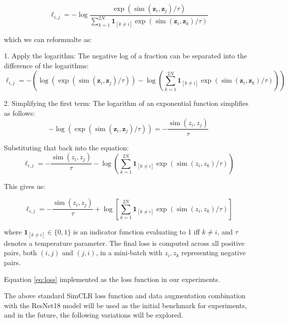 \begin{equation}
\ell_{i, j} = -\log \frac{\exp \left(\operatorname{sim}\left(\boldsymbol{z}_i, \boldsymbol{z}_j\right) / \tau\right)}{\sum_{k=1}^{2 N} \mathbf{1}_{[k \neq i]} \exp \left(\operatorname{sim}\left(\boldsymbol{z}_i, \boldsymbol{z}_k\right) / \tau\right)}
\label{eq:original}
\end{equation}
  
which we can reformualte as:

1. Apply the logarithm: The negative log of a fraction can be separated into the difference of the logarithms:
\[
\ell_{i, j} = -\left( \log \left(\exp \left(\operatorname{sim}\left(\boldsymbol{z}_i, \boldsymbol{z}_j\right) / \tau\right)\right) - \log\left( \sum_{k=1}^{2 N} \mathbf{1}_{[k \neq i]} \exp \left(\operatorname{sim}\left(\boldsymbol{z}_i, \boldsymbol{z}_k\right) / \tau\right) \right) \right)
\]

2. Simplifying the first term: The logarithm of an exponential function simplifies as follows:
\[
-\log\left(\exp\left(\operatorname{sim}\left(\boldsymbol{z}_i, \boldsymbol{z}_j\right) / \tau\right)\right) = -\frac{\operatorname{sim}\left(z_{i}, z_{j}\right)}{\tau}
\]

Substituting that back into the equation:
\[
\ell_{i, j} = -\frac{\operatorname{sim}\left(z_{i}, z_{j}\right)}{\tau} - \log\left(\sum_{k=1}^{2 N} \mathbf{1}_{[k \neq i]} \exp\left(\operatorname{sim}\left(z_{i}, z_{k}\right) / \tau\right)\right)
\]

This gives us:

\begin{equation}
\ell_{i, j} = -\frac{\operatorname{sim}\left(z_{i}, z_{j}\right)}{\tau} + \log\left[\sum_{k=1}^{2 N} \mathbf{1}_{[k \neq i]} \exp\left(\operatorname{sim}\left(z_{i}, z_{k}\right) / \tau\right)\right]
\label{eq:loss}
\end{equation}

where \(\mathbf{1}_{[k \neq i]} \in \{0, 1\}\) is an indicator function evaluating to 1 iff \(k \neq i\), and \(\tau\) denotes a temperature parameter. The final loss is computed across all positive pairs, both \((i, j)\) and \((j, i)\), in a mini-batch with $z_i, z_k$ representing negative pairs.

Equation \ref{eq:loss} implemented as the loss function in our experiments.

The above standard SimCLR loss function and data augmentation combination  with the ResNet18 model will be used as the initial benchmark for experiments, and in the future, the following variations will be explored.

